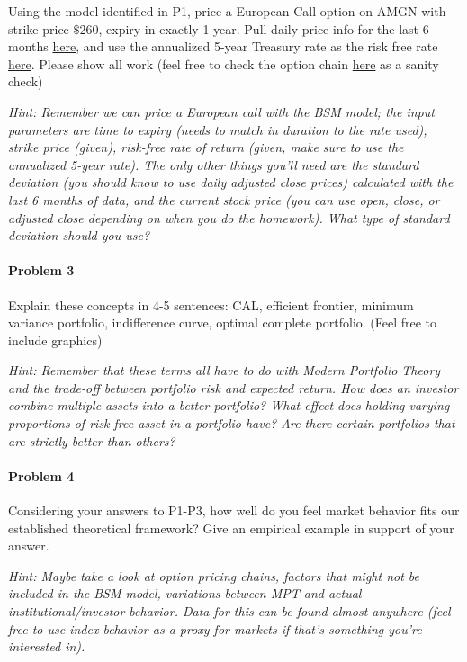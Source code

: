 \documentclass[
]{article}
\begin{document}
Using the model identified in P1, price a European Call option on AMGN
with strike price \(\$260\), expiry in exactly 1 year. Pull daily price
info for the last 6 months
\href{https://finance.yahoo.com/quote/AMGN/history?p=AMGN}{here}, and
use the annualized 5-year Treasury rate as the risk free rate
\href{https://www.treasury.gov/resource-center/data-chart-center/interest-rates/pages/textview.aspx?data=yield}{here}.
Please show all work (feel free to check the option chain
\href{https://finance.yahoo.com/quote/AMGN/options/}{here} as a sanity
check)

\emph{Hint: Remember we can price a European call with the BSM model;
the input parameters are time to expiry (needs to match in duration to
the rate used), strike price (given), risk-free rate of return (given,
make sure to use the annualized 5-year rate). The only other things
you'll need are the standard deviation (you should know to use daily
adjusted close prices) calculated with the last 6 months of data, and
the current stock price (you can use open, close, or adjusted close
depending on when you do the homework). What type of standard deviation
should you use?}

\hypertarget{problem-3}{%
\paragraph{Problem 3}\label{problem-3}}

Explain these concepts in 4-5 sentences: CAL, efficient frontier,
minimum variance portfolio, indifference curve, optimal complete
portfolio. (Feel free to include graphics)

\emph{Hint: Remember that these terms all have to do with Modern
Portfolio Theory and the trade-off between portfolio risk and expected
return. How does an investor combine multiple assets into a better
portfolio? What effect does holding varying proportions of risk-free
asset in a portfolio have? Are there certain portfolios that are
strictly better than others?}

\hypertarget{problem-4}{%
\paragraph{Problem 4}\label{problem-4}}

Considering your answers to P1-P3, how well do you feel market behavior
fits our established theoretical framework? Give an empirical example in
support of your answer.

\emph{Hint: Maybe take a look at option pricing chains, factors that
might not be included in the BSM model, variations between MPT and
actual institutional/investor behavior. Data for this can be found
almost anywhere (feel free to use index behavior as a proxy for markets
if that's something you're interested in).}
\end{document}
